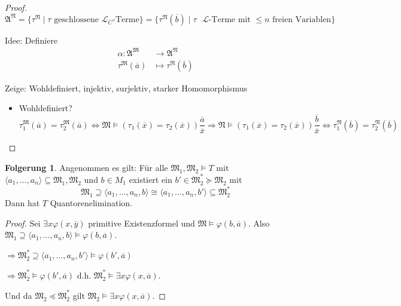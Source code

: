\documentclass[12pt,parskip=full]{scrartcl}
\theoremstyle{definition}
\newtheorem{corollary}[theorem]{Folgerung}
\begin{document}
\begin{proof}
		\begin{equation*}
			\mathfrak{A}^\mathfrak{N} = \{ \tau^\mathfrak{N} \mid \text{$\tau$ geschlossene $\mathcal{L}_{\overline{C}}$-Terme} \} = \{ \tau^\mathfrak{N}(\overline{b}) \mid \text{$\tau$ $\mathcal{L}$-Terme mit $\leq n$ freien Variablen} \}
		\end{equation*}
		
		Idee: Definiere
		\begin{align*}
			\alpha: \mathfrak{A}^\mathfrak{M} &\to \mathfrak{A}^\mathfrak{N} \\
			\tau^\mathfrak{M}(\overline{a}) &\mapsto \tau^\mathfrak{N}(\overline{b})
		\end{align*}
		
		Zeige: Wohldefiniert, injektiv, surjektiv, starker Homomorphismus
		\begin{itemize}
			\item Wohldefiniert?
			\begin{equation*}
				\tau_1^\mathfrak{M}(\overline{a}) = \tau_2^\mathfrak{M}(\overline{a}) \Leftrightarrow \mathfrak{M} \models (\tau_1(\overline{x}) = \tau_2(\overline{x}))\frac{\overline{a}}{\overline{x}} \Rightarrow \mathfrak{N} \models (\tau_1(\overline{x}) = \tau_2(\overline{x}))\frac{\overline{b}}{\overline{x}} \Leftrightarrow \tau_1^\mathfrak{N}(\overline{b}) = \tau_2^\mathfrak{N}(\overline{b})
			\end{equation*}
		\end{itemize}
	\end{proof}

	\begin{corollary}
		Angenommen es gilt: Für alle $\mathfrak{M}_1, \mathfrak{M}_2 \models T$ mit $\langle a_1, \dots, a_n \rangle \subseteq \mathfrak{M}_1, \mathfrak{M}_2$ und $b \in M_1$ existiert ein $b' \in \mathfrak{M}_2^* \succcurlyeq \mathfrak{M}_2$ mit
		\begin{equation*}
			\mathfrak{M}_1 \supseteq \langle a_1, \dots, a_n, b \rangle \cong \langle a_1, \dots, a_n, b' \rangle \subseteq \mathfrak{M}_2^*
		\end{equation*}
		Dann hat $T$ Quantorenelimination.
	\end{corollary}

	\begin{proof}
		Sei $\exists x \varphi(x,\overline{y})$ primitive Existenzformel und $\mathfrak{M} \models \varphi(b, \overline{a})$. Also $\mathfrak{M}_1 \supseteq \langle a_1, \dots, a_n, b \rangle \models \varphi(b, \overline{a})$.
		
		$\Rightarrow \mathfrak{M}_2^* \supseteq \langle a_1, \dots, a_n, b' \rangle \models \varphi(b', \overline{a})$
		
		$\Rightarrow \mathfrak{M}_2^* \models \varphi(b', \overline{a})$ d.h. $\mathfrak{M}_2^* \models \exists x \varphi(x, \overline{a})$.
		
		Und da $\mathfrak{M}_2 \preccurlyeq \mathfrak{M}_2^*$ gilt $\mathfrak{M}_2 \models \exists x \varphi(x, \overline{a})$.
	\end{proof}
\end{document}
